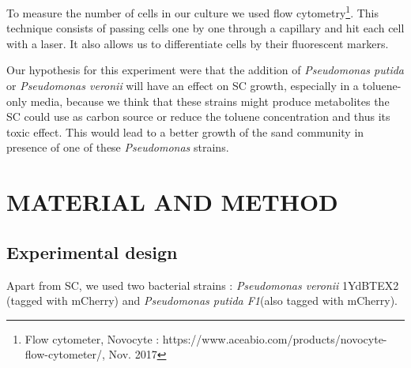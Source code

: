 \documentclass[a4paper, 10pt, conference]{ieeeconf}   %
\begin{document}
To measure the number of cells in our culture we used flow cytometry\footnote{Flow cytometer, Novocyte : https://www.aceabio.com/products/nov\linebreak[0]ocyte-flow-cytometer/, Nov. 2017}. This technique consists of passing cells one by one through a capillary and hit each cell with a laser. It also allows us to differentiate cells by their fluorescent markers.




Our hypothesis for this experiment were that the addition of \textit{Pseudomonas putida} or \textit{Pseudomonas veronii} will have an effect on SC growth, especially in a toluene-only media, because we think that these strains might produce metabolites the SC could use as carbon source or reduce the toluene concentration and thus its toxic effect. This would lead to a better growth of the sand community in presence of one of these \textit{Pseudomonas} strains.


\section{MATERIAL AND METHOD}

\subsection{Experimental design}
Apart from SC, we used two bacterial strains : \textit{Pseudomonas veronii} 1YdBTEX2 (tagged with mCherry) and \textit{Pseudomonas putida F1}(also tagged with mCherry).
\end{document}
